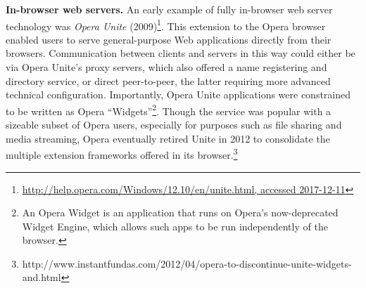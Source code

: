 \textbf{In-browser web servers.}
An early example of fully in-browser web server technology was \textit{Opera Unite} (2009)\footnote{\url{http://help.opera.com/Windows/12.10/en/unite.html, accessed 2017-12-11}}.
This extension to the Opera browser enabled users to serve general-purpose Web applications directly from their browsers. 
Communication between clients and servers in this way could either be via Opera Unite's proxy servers, which also offered a name registering and directory service, or direct peer-to-peer, the latter requiring more advanced technical configuration.
Importantly, Opera Unite applications were constrained to be written as Opera ``Widgets''\footnote{An Opera Widget is an application that runs on Opera's now-deprecated Widget Engine, which allows such apps to be run independently of the browser.}.
Though the service was popular with a sizeable subset of Opera users, especially for purposes such as file sharing and media streaming, Opera eventually retired Unite in 2012 to consolidate the multiple extension frameworks offered in its browser.\footnote{http://www.instantfundas.com/2012/04/opera-to-discontinue-unite-widgets-and.html}

